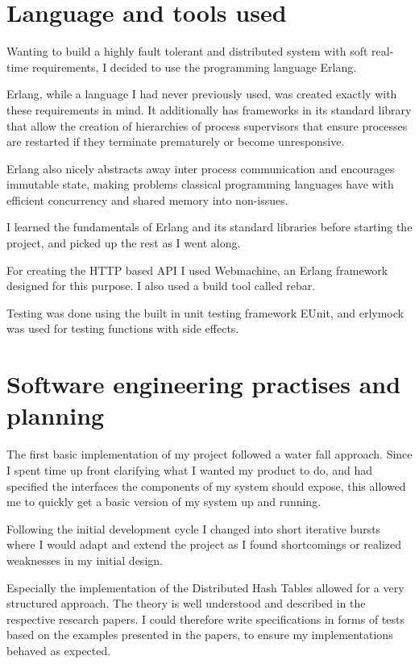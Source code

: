 \section{Language and tools used}
Wanting to build a highly fault tolerant and distributed system with soft real-time requirements, I decided to use the programming language Erlang.

Erlang, while a language I had never previously used, was created exactly with these requirements in mind. It additionally has frameworks in its standard library that allow the creation of hierarchies of process supervisors that ensure processes are restarted if they terminate prematurely or become unresponsive.

Erlang also nicely abstracts away inter process communication and encourages immutable state, making problems classical programming languages have with efficient concurrency and shared memory into non-issues.

I learned the fundamentals of Erlang and its standard libraries before starting the project, and picked up the rest as I went along.

For creating the HTTP based API I used Webmachine, an Erlang framework designed for this purpose. I also used a build tool called rebar.

Testing was done using the built in unit testing framework EUnit, and erlymock was used for testing functions with side effects.

\section{Software engineering practises and planning}
The first basic implementation of my project followed a water fall approach. Since I spent time up front clarifying  what I wanted my product to do, and had specified the interfaces the components of my system should expose, this allowed me to quickly get a basic version of my system up and running.

Following the initial development cycle I changed into short iterative bursts where I would adapt and extend the project as I found shortcomings or realized weaknesses in my initial design.

Especially the implementation of the Distributed Hash Tables allowed for a very structured approach. The theory is well understood and described in the respective research papers. I could therefore write specifications in forms of tests based on the examples presented in the papers, to ensure my implementations behaved as expected.

